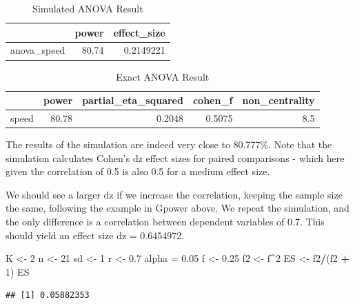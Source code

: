 \documentclass[]{book}
\newenvironment{Shaded}{\begin{snugshade}}{\end{snugshade}}
\newcommand{\DecValTok}[1]{\textcolor[rgb]{0.00,0.00,0.81}{#1}}
\newcommand{\FloatTok}[1]{\textcolor[rgb]{0.00,0.00,0.81}{#1}}
\newcommand{\NormalTok}[1]{#1}
\newcommand{\OperatorTok}[1]{\textcolor[rgb]{0.81,0.36,0.00}{\textbf{#1}}}
\newcommand{\StringTok}[1]{\textcolor[rgb]{0.31,0.60,0.02}{#1}}
\begin{document}
\begin{table}[t]

\caption{\label{tab:unnamed-chunk-96}Simulated ANOVA Result}
\centering
\begin{tabular}{l|r|r}
\hline
  & power & effect\_size\\
\hline
anova\_speed & 80.74 & 0.2149221\\
\hline
\end{tabular}
\end{table}

\begin{table}[t]

\caption{\label{tab:unnamed-chunk-98}Exact ANOVA Result}
\centering
\begin{tabular}{l|r|r|r|r}
\hline
  & power & partial\_eta\_squared & cohen\_f & non\_centrality\\
\hline
speed & 80.78 & 0.2048 & 0.5075 & 8.5\\
\hline
\end{tabular}
\end{table}

The results of the simulation are indeed very close to 80.777\%. Note that the simulation calculates Cohen's dz effect sizes for paired comparisons - which here given the correlation of 0.5 is also 0.5 for a medium effect size.

We should see a larger dz if we increase the correlation, keeping the sample size the same, following the example in Gpower above. We repeat the simulation, and the only difference is a correlation between dependent variables of 0.7. This should yield an effect size dz = 0.6454972.

\begin{Shaded}
\begin{Highlighting}[]
\NormalTok{K <-}\StringTok{ }\DecValTok{2}
\NormalTok{n <-}\StringTok{ }\DecValTok{21}
\NormalTok{sd <-}\StringTok{ }\DecValTok{1}
\NormalTok{r <-}\StringTok{ }\FloatTok{0.7}
\NormalTok{alpha =}\StringTok{ }\FloatTok{0.05}
\NormalTok{f <-}\StringTok{ }\FloatTok{0.25}
\NormalTok{f2 <-}\StringTok{ }\NormalTok{f}\OperatorTok{^}\DecValTok{2}
\NormalTok{ES <-}\StringTok{ }\NormalTok{f2}\OperatorTok{/}\NormalTok{(f2 }\OperatorTok{+}\StringTok{ }\DecValTok{1}\NormalTok{)}
\NormalTok{ES}
\end{Highlighting}
\end{Shaded}

\begin{verbatim}
## [1] 0.05882353
\end{verbatim}
\end{document}
